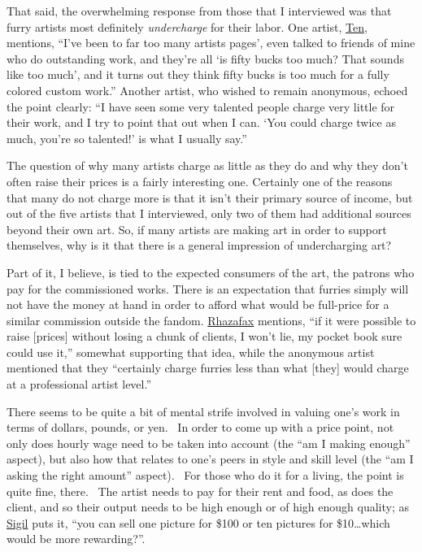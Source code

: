 That said, the overwhelming response from those that I interviewed was
that furry artists most definitely \emph{undercharge} for their labor.
One artist, \href{http://www.furaffinity.net/user/ten"}{Ten}, mentions,
``I've been to far too many artists pages', even talked to friends of
mine who do outstanding work, and they're all `is fifty bucks too much?
That sounds like too much', and it turns out they think fifty bucks is
too much for a fully colored custom work.'' Another artist, who wished
to remain anonymous, echoed the point clearly: ``I have seen some very
talented people charge very little for their work, and I try to point
that out when I can. `You could charge twice as much, you're so
talented!' is what I usually say.''

The question of why many artists charge as little as they do and why
they don't often raise their prices is a fairly interesting one.
Certainly one of the reasons that many do not charge more is that it
isn't their primary source of income, but out of the five artists that I
interviewed, only two of them had additional sources beyond their own
art. So, if many artists are making art in order to support themselves,
why is it that there is a general impression of undercharging art?

Part of it, I believe, is tied to the expected consumers of the art, the
patrons who pay for the commissioned works. There is an expectation that
furries simply will not have the money at hand in order to afford what
would be full-price for a similar commission outside the fandom.
\href{http://www.furaffinity.net/user/rhazafax}{Rhazafax} mentions, ``if
it were possible to raise {[}prices{]} without losing a chunk of
clients, I won't lie, my pocket book sure could use it,'' somewhat
supporting that idea, while the anonymous artist mentioned that they
``certainly charge furries less than what {[}they{]} would charge at a
professional artist level.''

There seems to be quite a bit of mental strife involved in valuing one's
work in terms of dollars, pounds, or yen. ~In order to come up with a
price point, not only does hourly wage need to be taken into account
(the ``am I making enough'' aspect), but also how that relates to one's
peers in style and skill level (the ``am I asking the right amount''
aspect). ~For those who do it for a living, the point is quite fine,
there. ~The artist needs to pay for their rent and food, as does the
client, and so their output needs to be high enough or of high enough
quality; as \href{http://www.furaffinity.net/user/sigil}{Sigil} puts it,
``you can sell one picture for \$100 or ten pictures for
\$10\ldots{}which would be more rewarding?''.


